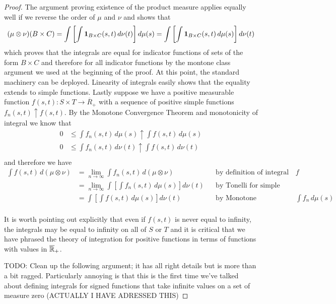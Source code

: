 \begin{proof}
The argument proving existence of the product measure applies equally well if we reverse the order
of $\mu$ and $\nu$ and shows that 
\begin{align*}
(\mu \otimes \nu)(B \times C) = \int \left [ \int \textbf{1}_{B
    \times C}(s,t) \, d
\nu(t) \right ] d \mu(s) = \int \left [ \int \textbf{1}_{B \times C}(s,t)
\, d \mu(s) \right ] d \nu(t)
\end{align*}
which proves that the integrals are equal for indicator functions of
sets of the form $B \times C$ and therefore for all indicator
functions by the montone class argument we used at the beginning of
the proof.  At this point, the
standard machinery can be deployed.  Linearity of integrals easily
shows that the equality extends to simple functions.  Lastly suppose
we have a positive measurable function $f(s,t) : S \times T \to
\overline{R}_+$ with a sequence of positive simple functions
$f_n(s,t) \uparrow f(s,t)$.  By the Monotone Convergence Theorem and
monotonicity of integral we know that 
\begin{align*}
0 &\leq \int f_n(s,t) \, d\mu(s) \uparrow \int f(s,t) \, d\mu(s) \\
0 &\leq \int f_n(s,t) \, d\nu(t) \uparrow \int f(s,t) \, d\nu(t) \\
\end{align*}
and therefore we have
\begin{align*}
\int f(s,t) \,  d (\mu \otimes \nu) 
&= \lim_{n \to \infty} \int
 f_n(s,t) \,  d (\mu \otimes \nu)  & & \text{by definition of integral
   of $f$}\\
&= \lim_{n \to \infty} \int \left [
\int f_n(s,t) \,  d \mu(s) \right ] d\nu(t) & &\text{by Tonelli
for simple functions}\\
&= \int \left [
\int f(s,t) \,  d \mu(s) \right ] d\nu(t) & &\text{by Monotone Convergence
   on $\int f_n \, d \mu(s)$}\\
\end{align*}

It is worth pointing out explicitly that even if $f(s,t)$ is never
equal to infinity, the integrals may be equal to infinity on all of
$S$ or $T$ and it is critical that we have phrased the theory of
integration for positive functions in terms of functions with values
in $\overline{\mathbb{R}}_+$.

TODO: Clean up the following argument; it has all right details but is
more than a bit ragged.  Particularly annoying is that this is the
first time we've talked about defining integrals for signed functions
that take infinite values on a set of measure zero (ACTUALLY I HAVE ADRESSED THIS)


\end{proof}
